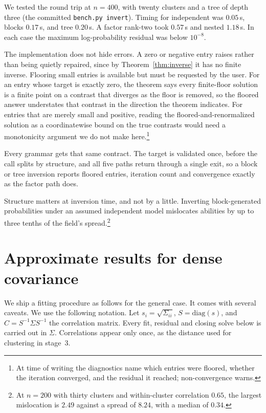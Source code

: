\documentclass[11pt]{article}
\begin{document}
We tested the round trip at $n=400$, with twenty
clusters and a tree of depth three (the committed \texttt{bench.py
invert}). Timing for independent was $0.05$\,s, blocks $0.17$\,s, and tree $0.20$\,s. A factor
rank-two took $0.57$\,s and nested $1.18$\,s. In each case the maximum log-probability residual was below $10^{-8}$.

The implementation does not hide errors. A zero or negative entry raises
rather than being quietly repaired, since by Theorem~\ref{thm:inverse} it
has no finite inverse. Flooring small entries is available but must be
requested by the user. For an entry whose target is exactly zero, the
theorem says every finite-floor solution is a finite point on a contrast
that diverges as the floor is removed, so the floored answer understates
that contrast in the direction the theorem indicates. For entries that
are merely small and positive, reading the floored-and-renormalized
solution as a coordinatewise bound on the true contrasts would need a
monotonicity argument we do not make here.\footnote{At time of writing
the diagnostics name which entries were floored, whether the iteration
converged, and the residual it reached; non-convergence warns.}

Every grammar gets that same contract. The target is validated once,
before the call splits by structure, and all five paths return through a
single exit, so a block or tree inversion reports floored entries,
iteration count and convergence exactly as the factor path does.

Structure matters at inversion time, and not by a little. Inverting
block-generated probabilities under an assumed independent model
mislocates abilities by up to three tenths of the field's spread.\footnote{At
$n=200$ with thirty clusters and within-cluster correlation $0.65$, the
largest mislocation is $2.49$ against a spread of $8.24$, with a median
of $0.34$.}

\section{Approximate results for dense covariance}\label{sec:general}

We ship a fitting procedure as follows for the general case. It comes with several caveats. We use the following notation. Let $s_i=\sqrt{\Sigma_{ii}}$,
$S=\mathrm{diag}(s)$, and $C=S^{-1}\Sigma S^{-1}$ the correlation
matrix. Every fit, residual and closing solve below is carried out in
$\Sigma$. Correlations appear only once, as the distance used for
clustering in stage~3.
\end{document}
